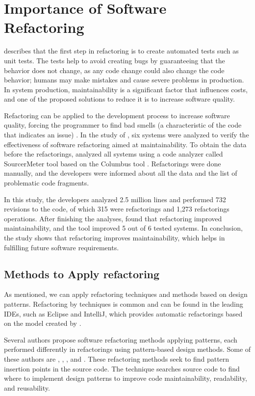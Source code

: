 \section{Importance of Software Refactoring}
\label{sec-importance}
\textcite{fowler2018refactoring} describes that the first step in refactoring is to create automated tests such as unit tests. The tests help to avoid creating bugs by guaranteeing that the behavior does not change, as any code change could also change the code behavior; humans may make mistakes and cause severe problems in production. In system production, maintainability is a significant factor that influences costs, and one of the proposed solutions to reduce it is to increase software quality. 

Refactoring can be applied to the development process to increase software quality, forcing the programmer to find bad smells (a characteristic of the code that indicates an issue) \cite{Wilking2007}. 
In the study of \textcite{szHoke2017empirical}, six systems were analyzed to verify the effectiveness of software refactoring aimed at maintainability. To obtain the data before the refactorings, \textcite{szHoke2017empirical} analyzed all systems using a code analyzer called SourcerMeter tool based on the Columbus tool \cite{ferenc2002}. Refactorings were done manually, and the developers were informed about all the data and the list of problematic code fragments. 

In this study, the developers analyzed 2.5 million lines and performed 732 revisions to the code, of which 315 were refactorings and 1,273 refactorings operations. After finishing the analyses, \textcite{szHoke2017empirical} found that refactoring improved maintainability, and the tool improved 5 out of 6 tested systems. In conclusion, the study shows that refactoring improves maintainability, which helps in fulfilling future software requirements.

\subsection{Methods to Apply refactoring}
\label{sub-methods}
As mentioned, we can apply refactoring techniques and methods based on design patterns. Refactoring by techniques is common and can be found in the leading IDEs, such as Eclipse and IntelliJ, which provides automatic refactorings based on the model created by \textcite{fowler2018refactoring}. 

Several authors propose software refactoring methods applying patterns, each performed differently in refactorings using pattern-based design methods. Some of these authors are \textcite{liu2014automated}, \textcite{zafeiris2017automated}, \textcite{cinneide2000automated}, and \cite{ouni2017more}. 
These refactoring methods seek to find pattern insertion points in the source code. The technique searches source code to find where to implement design patterns to improve code maintainability, readability, and reusability. 

